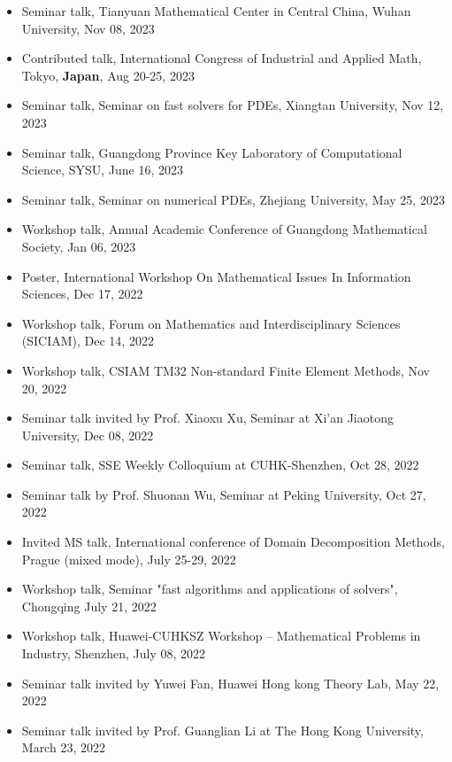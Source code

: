 \documentclass[letterpaper]{article}
\begin{document}
\begin{itemize}[leftmargin=*]
\item Seminar talk, Tianyuan Mathematical Center in Central China, Wuhan University, Nov 08, 2023
\item Contributed talk, International Congress of Industrial and Applied Math, Tokyo, {\bf Japan}, Aug 20-25, 2023
\item Seminar talk, Seminar on fast solvers for PDEs, Xiangtan University, Nov 12, 2023
\item Seminar talk, Guangdong Province Key Laboratory of Computational Science, SYSU, June 16, 2023
\item Seminar talk, Seminar on numerical PDEs, Zhejiang University, May 25, 2023
\item Workshop talk, Annual Academic Conference of Guangdong Mathematical Society, Jan 06, 2023
\item Poster, International Workshop On Mathematical Issues In Information Sciences, Dec 17, 2022
\item Workshop talk, Forum on Mathematics and Interdisciplinary Sciences (SICIAM), Dec 14, 2022
\item Workshop talk, CSIAM  TM32 Non-standard Finite Element Methods, Nov 20, 2022
\item Seminar talk invited  by Prof. Xiaoxu Xu, Seminar at Xi’an Jiaotong University, Dec 08, 2022
\item  Seminar talk, SSE Weekly Colloquium at CUHK-Shenzhen, Oct 28, 2022
\item Seminar talk by Prof. Shuonan Wu, Seminar at Peking University, Oct 27, 2022
\item Invited MS talk, International conference of Domain Decomposition Methods, Prague (mixed mode), July 25-29, 2022
\item Workshop  talk, Seminar  "fast algorithms and applications of solvers", Chongqing  July 21, 2022
\item Workshop talk, Huawei-CUHKSZ Workshop – Mathematical Problems in Industry, Shenzhen, July 08, 2022
\item Seminar  talk invited by Yuwei Fan, Huawei Hong kong Theory Lab, May 22, 2022
\item Seminar talk invited by Prof. Guanglian Li at The Hong Kong University, March 23, 2022



\end{itemize}
\end{document}
